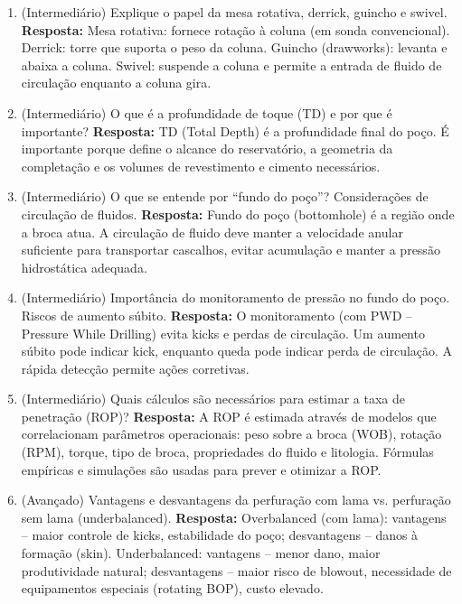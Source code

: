 \documentclass[11pt,a4paper]{article}
\begin{document}
\begin{enumerate}
  \item (Intermediário) Explique o papel da mesa rotativa, derrick, guincho e swivel.
  \textbf{Resposta:} Mesa rotativa: fornece rotação à coluna (em sonda convencional). Derrick: torre que suporta o peso da coluna. Guincho (drawworks): levanta e abaixa a coluna. Swivel: suspende a coluna e permite a entrada de fluido de circulação enquanto a coluna gira.

  \item (Intermediário) O que é a profundidade de toque (TD) e por que é importante?
  \textbf{Resposta:} TD (Total Depth) é a profundidade final do poço. É importante porque define o alcance do reservatório, a geometria da completação e os volumes de revestimento e cimento necessários.

  \item (Intermediário) O que se entende por ``fundo do poço''? Considerações de circulação de fluidos.
  \textbf{Resposta:} Fundo do poço (bottomhole) é a região onde a broca atua. A circulação de fluido deve manter a velocidade anular suficiente para transportar cascalhos, evitar acumulação e manter a pressão hidrostática adequada.

  \item (Intermediário) Importância do monitoramento de pressão no fundo do poço. Riscos de aumento súbito.
  \textbf{Resposta:} O monitoramento (com PWD – Pressure While Drilling) evita kicks e perdas de circulação. Um aumento súbito pode indicar kick, enquanto queda pode indicar perda de circulação. A rápida detecção permite ações corretivas.

  \item (Intermediário) Quais cálculos são necessários para estimar a taxa de penetração (ROP)?
  \textbf{Resposta:} A ROP é estimada através de modelos que correlacionam parâmetros operacionais: peso sobre a broca (WOB), rotação (RPM), torque, tipo de broca, propriedades do fluido e litologia. Fórmulas empíricas e simulações são usadas para prever e otimizar a ROP.

  \item (Avançado) Vantagens e desvantagens da perfuração com lama vs. perfuração sem lama (underbalanced).
  \textbf{Resposta:} Overbalanced (com lama): vantagens – maior controle de kicks, estabilidade do poço; desvantagens – danos à formação (skin). Underbalanced: vantagens – menor dano, maior produtividade natural; desvantagens – maior risco de blowout, necessidade de equipamentos especiais (rotating BOP), custo elevado.


\end{enumerate}
\end{document}
